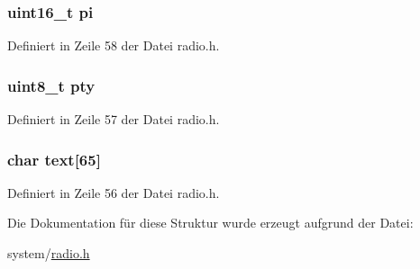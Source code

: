 \subsubsection[{pi}]{\setlength{\rightskip}{0pt plus 5cm}uint16\+\_\+t {\bf pi}}\label{structradio__rds_ad1803744db28ac0d226ec8da9134598e}


Definiert in Zeile 58 der Datei radio.\+h.

\hypertarget{structradio__rds_acd9e098011d2119e8838cd393abfbcce}{}
\subsubsection[{pty}]{\setlength{\rightskip}{0pt plus 5cm}uint8\+\_\+t pty}\label{structradio__rds_acd9e098011d2119e8838cd393abfbcce}


Definiert in Zeile 57 der Datei radio.\+h.

\hypertarget{structradio__rds_a1d7cd4d36a6a2fa49631cef5d5847187}{}
\subsubsection[{text}]{\setlength{\rightskip}{0pt plus 5cm}char text\mbox{[}65\mbox{]}}\label{structradio__rds_a1d7cd4d36a6a2fa49631cef5d5847187}


Definiert in Zeile 56 der Datei radio.\+h.



Die Dokumentation für diese Struktur wurde erzeugt aufgrund der Datei\+:\begin{DoxyCompactItemize}
\item 
system/\hyperlink{radio_8h}{radio.\+h}\end{DoxyCompactItemize}
